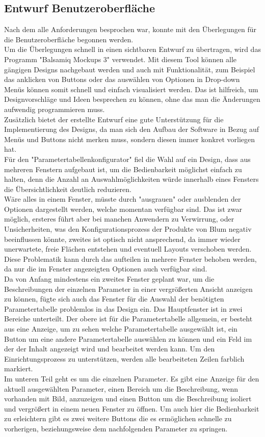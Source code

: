 \documentclass[10pt,a4paper]{article}
\begin{document}
\subsection{Entwurf Benutzeroberfläche}
Nach dem alle Anforderungen besprochen war, konnte mit den Überlegungen für die Benutzeroberfläche begonnen werden. \\
Um die Überlegungen schnell in einen sichtbaren Entwurf zu übertragen, wird das Programm "Balsamiq Mockups 3" verwendet. Mit diesem Tool können alle gängigen Designs nachgebaut werden und auch mit Funktionalität, zum Beispiel das anklicken von Buttons oder das auswählen von Optionen in Drop-down Menüs können somit schnell und einfach visualisiert werden. Das ist hilfreich, um Designvorschläge und Ideen besprechen zu können, ohne das man die Änderungen aufwendig programmieren muss.
\\Zusätzlich bietet der erstellte Entwurf eine gute Unterstützung für die Implementierung des Designs, da man sich den Aufbau der Software in Bezug auf Menüs und Buttons nicht merken muss, sondern diesen immer konkret vorliegen hat.
\\Für den "Parametertabellenkonfigurator" fiel die Wahl auf ein Design, dass aus mehreren Fenstern aufgebaut ist, um die Bedienbarkeit möglichst einfach zu halten, denn die Anzahl an Auswahlmöglichkeiten würde innerhalb eines Fensters die Übersichtlichkeit deutlich reduzieren.
\\ Wäre alles in einem Fenster, müsste durch "ausgrauen" oder ausblenden der Optionen dargestellt werden, welche momentan verfügbar sind. Das ist zwar möglich, ersteres führt aber bei manchen Anwendern zu Verwirrung, oder Unsicherheiten, was den Konfigurationsprozess der Produkte von Blum negativ beeinflussen könnte, zweites ist optisch nicht ansprechend, da immer wieder unerwartete, freie Flächen entstehen und eventuell Layouts verschoben werden. \\
Diese Problematik kann durch das aufteilen in mehrere Fenster behoben werden, da nur die im Fenster angezeigten Optionen auch verfügbar sind. 
\\Da von Anfang mindestens ein zweites Fenster geplant war, um die Beschreibungen der einzelnen Parameter in einer vergrößerten Ansicht anzeigen zu können, fügte sich auch das Fenster für die Auswahl der benötigten Parametertabelle problemlos in das Design ein. 
Das Hauptfenster ist in zwei Bereiche unterteilt. Der obere ist für die Parametertabelle allgemein, er besteht aus eine Anzeige, um zu sehen welche Parametertabelle ausgewählt ist, ein Button um eine andere Parametertabelle auswählen zu können und ein Feld im der der Inhalt angezeigt wird und bearbeitet werden kann. Um den Einrichtungsprozess zu unterstützen, werden alle bearbeiteten Zeilen farblich markiert. 
\\Im unteren Teil geht es um die einzelnen Parameter. Es gibt eine Anzeige für den aktuell ausgewählten Parameter, einen Bereich um die Beschreibung, wenn vorhanden mit Bild, anzuzeigen und einen Button um die Beschreibung isoliert und vergrößert in einem neuen Fenster zu öffnen. Um auch hier die Bedienbarkeit zu erleichtern gibt es zwei weitere Buttons die es ermöglichen schnelle zu vorherigen, beziehungsweise dem nachfolgenden Parameter zu springen.
\end{document}
